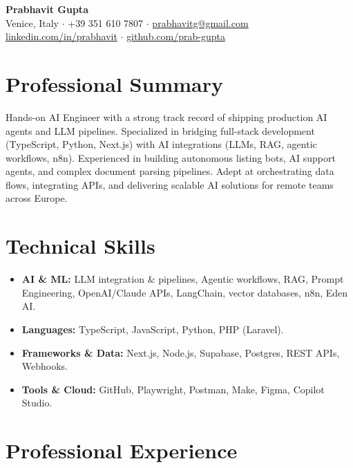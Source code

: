 \documentclass[10pt,a4paper]{article}
\begin{document}
\pagestyle{empty}

\begin{center}
    {\Huge \textbf{Prabhavit Gupta}} \\[6pt]
    Venice, Italy $\cdot$ +39 351 610 7807 $\cdot$ \href{mailto:prabhavitg@gmail.com}{prabhavitg@gmail.com} \\[2pt]
    \href{https://www.linkedin.com/in/prabhavit/}{linkedin.com/in/prabhavit} $\cdot$ \href{https://github.com/prab-gupta}{github.com/prab-gupta}
\end{center}

\vspace{5pt}

\section*{Professional Summary}
Hands-on AI Engineer with a strong track record of shipping production AI agents and LLM pipelines. Specialized in bridging full-stack development (TypeScript, Python, Next.js) with AI integrations (LLMs, RAG, agentic workflows, n8n). Experienced in building autonomous listing bots, AI support agents, and complex document parsing pipelines. Adept at orchestrating data flows, integrating APIs, and delivering scalable AI solutions for remote teams across Europe.

\section*{Technical Skills}
\begin{itemize}
    \item \textbf{AI \& ML:} LLM integration \& pipelines, Agentic workflows, RAG, Prompt Engineering, OpenAI/Claude APIs, LangChain, vector databases, n8n, Eden AI.
    \item \textbf{Languages:} TypeScript, JavaScript, Python, PHP (Laravel).
    \item \textbf{Frameworks \& Data:} Next.js, Node.js, Supabase, Postgres, REST APIs, Webhooks.
    \item \textbf{Tools \& Cloud:} GitHub, Playwright, Postman, Make, Figma, Copilot Studio.
\end{itemize}

\section*{Professional Experience}
\end{document}
